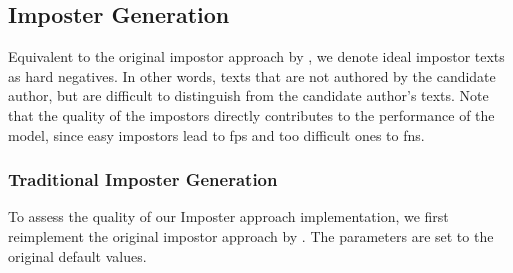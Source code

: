 \subsection{Imposter Generation}
\label{subsec:impostor_generation}

Equivalent to the original impostor approach by \citet{koppel_determining_2014}, we denote ideal impostor texts as hard negatives.
In other words, texts that are not authored by the candidate author, but are difficult to distinguish from the candidate author's texts.
Note that the quality of the impostors directly contributes to the performance of the model, 
since easy impostors lead to \acp{fp} and too difficult ones to \acp{fn}.

\subsubsection{Traditional Imposter Generation}
\label{subsubsec:traditional_impostor_generation}

To assess the quality of our Imposter approach implementation, we first reimplement the original impostor approach by \citet{koppel_determining_2014}.
The parameters are set to the original default values.



